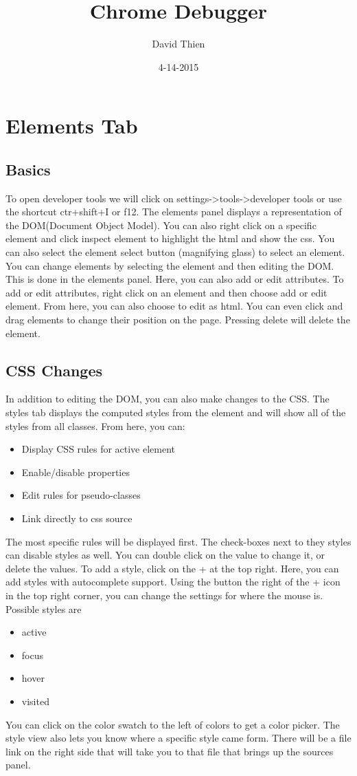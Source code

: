 \documentclass{article}
\title{Chrome Debugger}
\date{4-14-2015}
\author{David Thien}
\begin{document}
	\maketitle
	\newpage
	\tableofcontents
	\newpage

	\section{Elements Tab}
	\subsection{Basics}
	To open developer tools we will click on settings->tools->developer tools or use the shortcut ctr+shift+I or f12.	The elements panel displays a representation of the DOM(Document Object Model). You can also right click on a specific element and click inspect element to highlight the html and show the css. You can also select the element select button (magnifying glass) to select an element. You can change elements by selecting the element and then editing the DOM. This is done in the elements panel. Here, you can also add or edit attributes. To add or edit attributes, right click on an element and then choose add or edit element. From here, you can also choose to edit as html. You can even click and drag elements to change their position on the page. Pressing delete will delete the element.
	\subsection{CSS Changes}
	In addition to editing the DOM, you can also make changes to the CSS. The styles tab displays the computed styles from the element and will show all of the styles from all classes. From here, you can:
	\begin{itemize}
		\item  Display CSS rules for active element
		\item  Enable/disable properties
		\item  Edit rules for pseudo-classes
		\item  Link directly to css source
	\end{itemize}
	The most specific rules will be displayed first. The check-boxes next to they styles can disable styles as well. You can double click on the value to change it, or  delete the values. To add a style, click on the + at the top right. Here, you can add styles with autocomplete support. Using the button the right of the + icon in the top right corner, you can  change the settings for where the mouse is. Possible styles are
  	\begin{itemize}
		\item active
  		\item focus
  		\item hover
  		\item visited
	\end{itemize}
You can click on the color swatch to the left of colors to get a color picker. The style view also lets you know where a specific style came form. There will be a file link on the right side that will take you to that file that brings up the sources panel.
\end{document}
